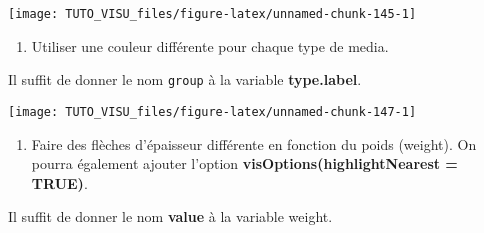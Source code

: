 \documentclass[]{article}
\newenvironment{Shaded}{\begin{snugshade}}{\end{snugshade}}
\newcommand{\DataTypeTok}[1]{\textcolor[rgb]{0.13,0.29,0.53}{#1}}
\newcommand{\DecValTok}[1]{\textcolor[rgb]{0.00,0.00,0.81}{#1}}
\newcommand{\KeywordTok}[1]{\textcolor[rgb]{0.13,0.29,0.53}{\textbf{#1}}}
\newcommand{\NormalTok}[1]{#1}
\newcommand{\OperatorTok}[1]{\textcolor[rgb]{0.81,0.36,0.00}{\textbf{#1}}}
\newcommand{\OtherTok}[1]{\textcolor[rgb]{0.56,0.35,0.01}{#1}}
\newcommand{\StringTok}[1]{\textcolor[rgb]{0.31,0.60,0.02}{#1}}
\providecommand{\tightlist}{%
  \setlength{\itemsep}{0pt}\setlength{\parskip}{0pt}}
\theoremstyle{definition}
\theoremstyle{definition}
\theoremstyle{definition}
\theoremstyle{remark}
\begin{document}
\begin{center}\texttt{[image: TUTO\_VISU\_files/figure-latex/unnamed-chunk-145-1]} \end{center}

\begin{enumerate}
\def\labelenumi{\arabic{enumi}.}
\setcounter{enumi}{2}
\tightlist
\item
  Utiliser une couleur différente pour chaque type de media.
\end{enumerate}

Il suffit de donner le nom \texttt{group} à la variable \textbf{type.label}.

\begin{Shaded}
\end{Shaded}

\begin{center}\texttt{[image: TUTO\_VISU\_files/figure-latex/unnamed-chunk-147-1]} \end{center}

\begin{enumerate}
\def\labelenumi{\arabic{enumi}.}
\setcounter{enumi}{3}
\tightlist
\item
  Faire des flèches d'épaisseur différente en fonction du poids (weight). On pourra également ajouter l'option \textbf{visOptions(highlightNearest = TRUE)}.
\end{enumerate}

Il suffit de donner le nom \textbf{value} à la variable weight.

\begin{Shaded}
\end{Shaded}
\end{document}
